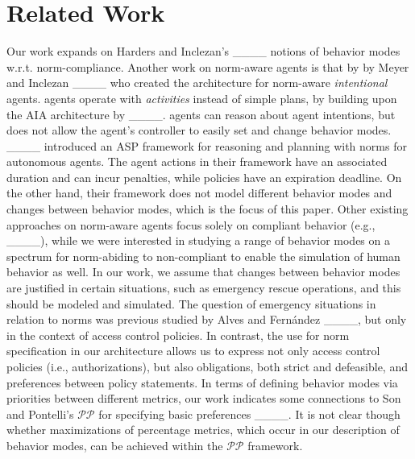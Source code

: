 \section{Related Work}
\label{sec:related}

Our work expands on Harders and Inclezan's ____ notions of behavior modes w.r.t. norm-compliance. Another work on norm-aware agents is that by by Meyer and Inclezan ____ who created the \apia architecture for norm-aware {\em intentional} agents. \apia agents operate with {\em activities} instead of simple plans, by building upon the AIA architecture by ____. %
\apia agents can reason about agent intentions, %
but does not allow the agent's controller to easily set and change behavior modes. %
____ introduced an ASP framework for reasoning and planning with norms for autonomous agents. The agent actions in their framework have an associated duration and can incur penalties, while policies have an expiration deadline. On the other hand, their framework does not model different behavior modes and changes between behavior modes, which is the focus of this paper. Other existing approaches on norm-aware agents focus solely on compliant behavior (e.g., ____), while we were interested in studying a range of behavior modes on a spectrum for norm-abiding to non-compliant to enable the simulation of human behavior as well.
%
In our work, we assume that changes between behavior modes are justified in certain situations, such as emergency rescue operations, and this should be modeled and simulated. The question of emergency situations in relation to norms was previous studied by Alves and Fernández ____, but only in the context of access control policies. In contrast, the use \aopl for norm specification in our architecture allows us to express not only access control policies (i.e., authorizations), but also obligations, both strict and defeasible, and preferences between policy statements.
%
In terms of defining behavior modes via priorities between different metrics, our work indicates some connections to Son and Pontelli's $\mathscr{PP}$ for specifying basic preferences ____. It is not clear though whether maximizations of percentage metrics, which occur in our description of behavior modes, can be achieved within the $\mathscr{PP}$ framework.

